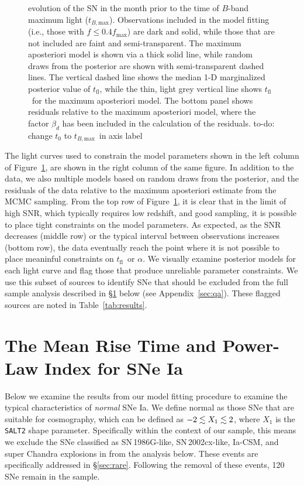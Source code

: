 \documentclass[twocolumn]{./aastex63}
\newcommand{\todo}[1]{{\color{magenta} to-do: {#1}}}
\newcommand{\tfl}{$t_\mathrm{fl}$}
\newcommand{\tbmax}{$t_{B,\mathrm{max}}$}
\begin{document}
\begin{figure}
{    evolution of the SN in the month prior to the time of $B$-band maximum
    light (\tbmax). Observations included in the model fitting (i.e., those
    with $f \le 0.4 f_\mathrm{max}$) are dark and solid, while those that are
    not included are faint and semi-transparent. The maximum aposteriori
    model is shown via a thick solid line, while random draws from the
    posterior are shown with semi-transparent dashed lines. The vertical
    dashed line shows the median 1-D marginalized posterior value of \tfl,
    while the thin, light grey vertical line shows \tfl\ for the maximum
    aposteriori model. The bottom panel shows residuals relative to the
    maximum aposteriori model, where the factor $\beta_d$ has been included
    in the calculation of the residuals. \todo{change $t_0$ to \tbmax\ in
    axis label}}
    \label{fig:corner_LC}
\end{figure}

The light curves used to constrain the model parameters shown in the left
column of Figure~\ref{fig:corner_LC}, are shown in the right column of the
same figure. In addition to the data, we also multiple models based on random
draws from the posterior, and the residuals of the data relative to the
maximum aposteriori estimate from the MCMC sampling. From the top row of
Figure~\ref{fig:corner_LC}, it is clear that in the limit of high SNR, which
typically requires low redshift, and good sampling, it is possible to place
tight constraints on the model parameters. As expected, as the SNR decreases
(middle row) or the typical interval between observations increases (bottom
row), the data eventually reach the point where it is not possible to place
meaninful constraints on \tfl\ or $\alpha$. We visually examine posterior
models for each light curve and flag those that produce unreliable parameter
constraints. We use this subset of sources to identify SNe that should be
excluded from the full sample analysis described in \S\ref{sec:mean_parameters}
below (see Appendix~\ref{sec:qa}). These flagged sources are noted in
Table~\ref{tab:results}.

\section{The Mean Rise Time and Power-Law Index for SNe
Ia}\label{sec:mean_parameters}

Below we examine the results from our model fitting procedure to examine the
typical characteristics of \textit{normal} SNe Ia. We define normal as those
SNe that are suitable for cosmography, which can be
defined as $-2 \lesssim X_1 \lesssim 2$, where $X_1$ is the \texttt{SALT2} shape
parameter. Specifically within the context of our sample, this means we
exclude the SNe classified as SN\,1986G-like, SN\,2002cx-like, Ia-CSM, and
super Chandra explosions in \citet{Yao19} from the analysis below. These
events are specifically addressed in \S\ref{sec:rare}. Following the removal
of these events, 120 SNe remain in the sample.
\end{document}
